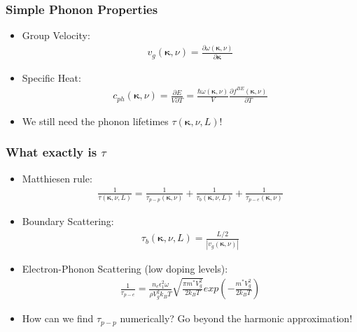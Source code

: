 \documentclass[]{beamer}
\begin{document}
\begin{frame}
  \frametitle{Simple Phonon Properties}   %

  \begin{itemize}
  \item Group Velocity:
\begin{align*}
v_g(\pmb{\kappa}, \nu)=\frac{\partial \omega(\pmb{\kappa},\nu)}{\partial \pmb{\kappa}}
\end{align*}
  \item Specific Heat:
\begin{align*}
c_{ph}(\pmb{\kappa},\nu)=\frac{\partial E}{V\partial T}=\frac{\hbar\omega(\pmb{\kappa},\nu)}{V}\frac{\partial f^{BE}(\pmb{\kappa}, \nu)}{\partial T}
\end{align*}
  \item We still need the phonon lifetimes $\tau(\pmb{\kappa}, \nu,L)$!
  \end{itemize}
\end{frame}

\begin{frame}
  \frametitle{What exactly is $\tau$}   %

  \begin{itemize}
  \item Matthiesen rule:
\begin{align*}
\frac{1}{\tau(\pmb{\kappa}, \nu,L)}=\frac{1}{\tau_{p-p}(\pmb{\kappa}, \nu)}+\frac{1}{\tau_{b}(\pmb{\kappa}, \nu,L)}+\frac{1}{\tau_{p-e}(\pmb{\kappa},\nu)}
\end{align*}
  \item Boundary Scattering:
\begin{align*}
\tau_{b}(\pmb{\kappa}, \nu,L)=\frac{L/2}{|v_g(\pmb{\kappa}, \nu)|}
\end{align*}
  \item Electron-Phonon Scattering (low doping levels):
\begin{align*}
\frac{1}{\tau_{p-e}}=\frac{n_e\epsilon_1^2\omega}{\rho V_g^2k_BT}\sqrt{\frac{\pi m^{*}V_g^2}{2k_BT}}exp(-\frac{m^{*}V_g^2}{2k_BT})
\end{align*}
  \item How can we find $\tau_{p-p}$ numerically? Go beyond the harmonic approximation!
  \end{itemize}
\end{frame}
\end{document}
